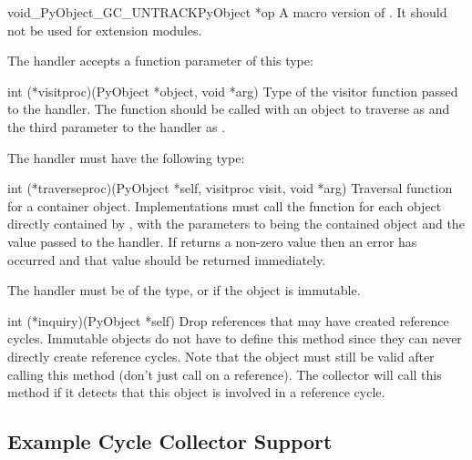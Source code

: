 \documentclass{manual}
\begin{document}
\begin{cfuncdesc}{void}{_PyObject_GC_UNTRACK}{PyObject *op}
  A macro version of .  It should not be
  used for extension modules.
\end{cfuncdesc}

The  handler accepts a function parameter of this
type:

\begin{ctypedesc}[visitproc]{int (*visitproc)(PyObject *object, void *arg)}
  Type of the visitor function passed to the 
  handler.  The function should be called with an object to traverse
  as  and the third parameter to the 
  handler as .
\end{ctypedesc}

The  handler must have the following type:

\begin{ctypedesc}[traverseproc]{int (*traverseproc)(PyObject *self,
                                visitproc visit, void *arg)}
  Traversal function for a container object.  Implementations must
  call the  function for each object directly contained by
  , with the parameters to  being the contained
  object and the  value passed to the handler.  If
   returns a non-zero value then an error has occurred and
  that value should be returned immediately.
\end{ctypedesc}

The  handler must be of the  type, or
\NULL{} if the object is immutable.

\begin{ctypedesc}[inquiry]{int (*inquiry)(PyObject *self)}
  Drop references that may have created reference cycles.  Immutable
  objects do not have to define this method since they can never
  directly create reference cycles.  Note that the object must still
  be valid after calling this method (don't just call
   on a reference).  The collector will call
  this method if it detects that this object is involved in a
  reference cycle.
\end{ctypedesc}


\subsection{Example Cycle Collector Support
            \label{example-cycle-support}}
\end{document}
